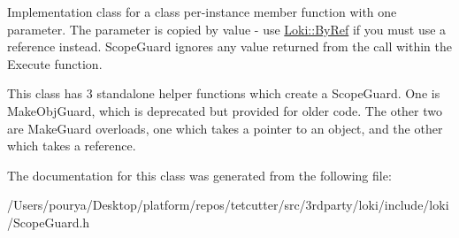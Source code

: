 Implementation class for a class per-\/instance member function with one parameter. The parameter is copied by value -\/ use \hyperlink{group__ExceptionGroup_ga0a94ba0342e6abcdb8f9b32ed5ad7e3d}{Loki\+::\+By\+Ref} if you must use a reference instead. Scope\+Guard ignores any value returned from the call within the Execute function.

This class has 3 standalone helper functions which create a Scope\+Guard. One is Make\+Obj\+Guard, which is deprecated but provided for older code. The other two are Make\+Guard overloads, one which takes a pointer to an object, and the other which takes a reference. 

The documentation for this class was generated from the following file\+:\begin{DoxyCompactItemize}
\item 
/\+Users/pourya/\+Desktop/platform/repos/tetcutter/src/3rdparty/loki/include/loki/Scope\+Guard.\+h\end{DoxyCompactItemize}
